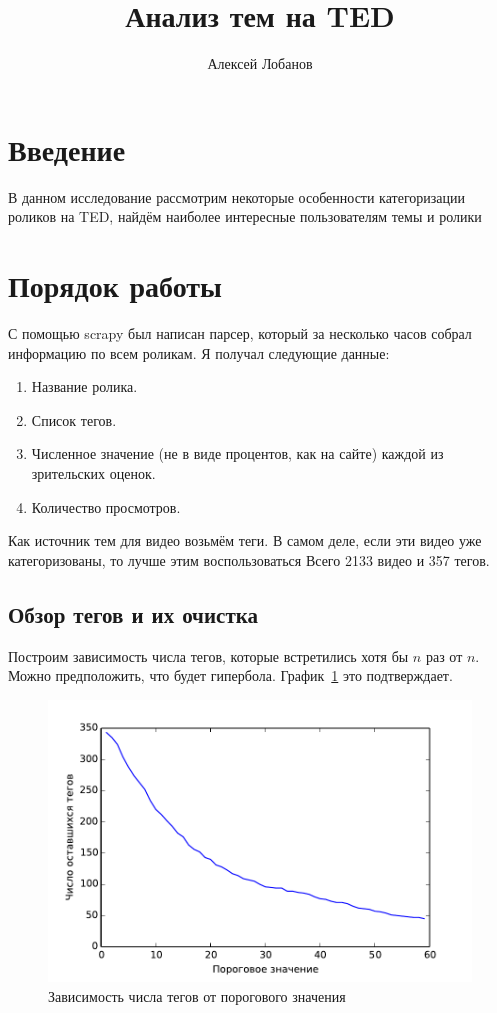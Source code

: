 \documentclass[12pt,a4paper]{scrartcl}
\author{Алексей Лобанов}
\title{Анализ тем на TED}
\begin{document}
\maketitle
\tableofcontents

\section{Введение}
В данном исследование рассмотрим некоторые особенности категоризации роликов на TED, найдём наиболее интересные пользователям темы и ролики

\section{Порядок работы}
С помощью scrapy был написан парсер, который за несколько часов собрал информацию по всем роликам. Я получал следующие данные:
\begin{enumerate}
\item Название ролика.
\item Список тегов.
\item Численное значение (не в виде процентов, как на сайте) каждой из зрительских оценок.
\item Количество просмотров.
\end{enumerate}

Как источник тем для видео возьмём теги. В самом деле, если эти видео уже категоризованы, то лучше этим воспользоваться
Всего 2133 видео и 357 тегов.
\subsection{Обзор тегов и их очистка}
Построим зависимость числа тегов, которые встретились хотя бы $n$ раз от $n$. Можно предположить, что будет гипербола. График~\ref{tags_from_val} это подтверждает.
\begin{figure}[hbp]
\includegraphics{tags_from_val.pdf}
\caption{Зависимость числа тегов от порогового значения}
\label{tags_from_val}
\end{figure}
\end{document}
